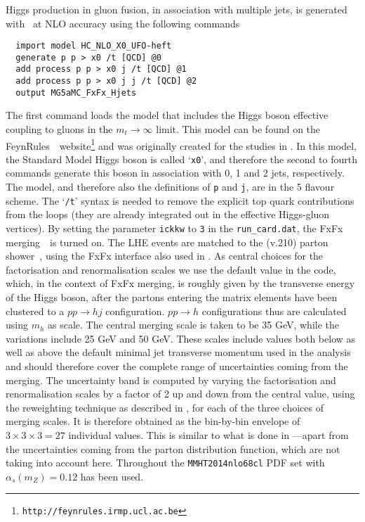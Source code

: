 \subsubsection{\MGaMC}
\label{sec:hjetscomp:tools:mc:mgamc}

Higgs production in gluon fusion, in association with multiple jets,
is generated with \MGaMC \cite{Alwall:2014hca}~at NLO
accuracy using the following commands
\begin{verbatim}
  import model HC_NLO_X0_UFO-heft
  generate p p > x0 /t [QCD] @0
  add process p p > x0 j /t [QCD] @1
  add process p p > x0 j j /t [QCD] @2
  output MG5aMC_FxFx_Hjets
\end{verbatim}
The first command loads the model that includes the Higgs boson
effective coupling to gluons in the $m_t\to\infty$ limit. This model
can be found on the
FeynRules~\cite{Alloul:2013bka}~website\footnote{\texttt{http://feynrules.irmp.ucl.ac.be}}
and was originally created for the studies in
\cite{Demartin:2014fia}. In this model, the Standard Model Higgs
boson is called `\texttt{x0}', and therefore the second to fourth
commands generate this boson in association with 0, 1 and 2 jets,
respectively. The model, and therefore also the definitions of
\texttt{p} and \texttt{j}, are in the 5 flavour scheme. The
`\texttt{/t}' syntax is needed to remove the explicit top quark
contributions from the loops (they are already integrated out in the
effective Higgs-gluon vertices). By setting the parameter
\texttt{ickkw} to \texttt{3} in the \texttt{run\_card.dat}, the FxFx
merging~\cite{Frederix:2012ps}~is turned on. The LHE events are
matched to the  (v.210) parton
shower~\cite{Sjostrand:2014zea}, using the FxFx interface also used in
\cite{Frederix:2015eii}. As central choices for the factorisation
and renormalisation scales we use the default value in the
\MGaMC code, which, in the context of FxFx merging, is
roughly given by the transverse energy of the Higgs boson, after the
partons entering the matrix elements have been clustered to a $pp \to h
j$ configuration. $pp\to h$ configurations thus are calculated using 
$m_h$ as scale. The central merging scale is taken to be 35 GeV,
while the variations include 25 GeV and 50 GeV. These scales include 
values both below as well as above the default minimal jet transverse
momentum used in the analysis and should therefore cover the complete
range of uncertainties coming from the merging.  The uncertainty band
is computed by varying the factorisation and renormalisation scales by
a factor of 2 up and down from the central value, using the reweighting
technique as described in \cite{Frederix:2011ss}, for each of the
three choices of merging scales. It is therefore obtained
as the bin-by-bin envelope of $3 \times 3 \times 3 = 27$ individual
values. This is similar to what is done in
\cite{Frederix:2015eii}---apart from the uncertainties coming
from the parton distribution function, which are not taking into
account here. Throughout the \texttt{MMHT2014nlo68cl} PDF set with 
$\alpha_s(m_Z)=0.12$ has been used.
